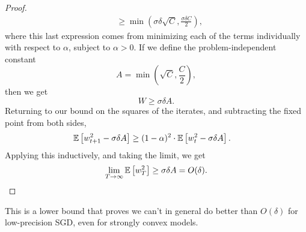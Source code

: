 \begin{proof}
\begin{align*}
  &\ge
  \min\left(
    \sigma \delta \sqrt{C}
  , 
    \frac{\sigma \delta C}{2}
  \right),
\end{align*}
where this last expression comes from minimizing each of the terms individually with respect to $\alpha$, subject to $\alpha > 0$.
If we define the problem-independent constant
\[
  A = \min\left(
    \sqrt{C}
  , 
    \frac{C}{2}
  \right),
\]
then we get
\[
  W \ge \sigma \delta A.
\]
Returning to our bound on the squares of the iterates, and subtracting the fixed point from both sides,
\begin{align*}
  \mathbb{E}\left[ w_{t+1}^2 - \sigma \delta A \right]
  &\ge
  (1 - \alpha)^2 \cdot \mathbb{E}\left[  w_t^2 - \sigma \delta A \right].
\end{align*}
Applying this inductively, and taking the limit, we get
\[
  \lim_{T \rightarrow \infty}
  \mathbb{E}\left[ w_T^2 \right]
  \ge
  \sigma \delta A
  =
  O(\delta).
\]

\end{proof}
This is a lower bound that proves we can't in general do better than $O(\delta)$ for low-precision SGD, even for strongly convex models.


\newpage 

